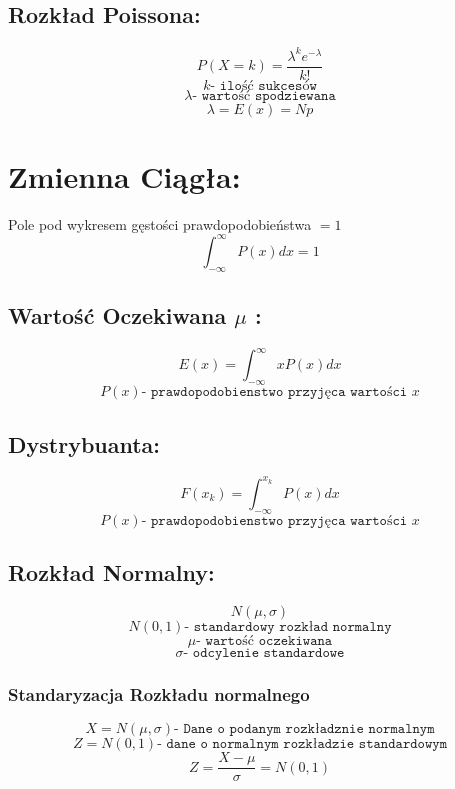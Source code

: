 \documentclass[fleqn]{article}
\begin{document}
\subsection*{Rozkład Poissona:}
\[P(X=k) = \frac{\lambda^ke^{-\lambda}}{k!}\]
\[k \texttt{- ilość sukcesów}\]
\[\lambda \texttt{- wartość spodziewana}\]
\[\lambda = E(x) = Np\]
\pagebreak
\section*{Zmienna Ciągła:}
Pole pod wykresem gęstości prawdopodobieństwa \(=1\)
\[\int_{-\infty}^{\infty}{P(x)dx}=1\]

\subsection*{Wartość Oczekiwana \(\mu\) :}
\[E(x) = \int_{-\infty}^{\infty}{xP(x)dx}\]
\[P(x) \texttt{- prawdopodobienstwo przyjęca wartości }x\]
\subsection*{Dystrybuanta:}
\[F(x_k) = \int_{-\infty}^{x_k}{P(x)dx}\]
\[P(x) \texttt{- prawdopodobienstwo przyjęca wartości }x\]

\subsection*{Rozkład Normalny:}
\[N(\mu,\sigma)\]
\[N(0,1) \texttt{- standardowy rozkład normalny}\]
\[\mu \texttt{- wartość oczekiwana}\]
\[\sigma \texttt{- odcylenie standardowe}\]
\subsubsection*{Standaryzacja Rozkładu normalnego}
\[X = N(\mu,\sigma) \texttt{- Dane o podanym rozkładznie normalnym}\]
\[Z = N(0,1) \texttt{- dane o normalnym rozkładzie standardowym}\]
\[Z = \frac{X-\mu}{\sigma} = N(0,1) \]
\end{document}
